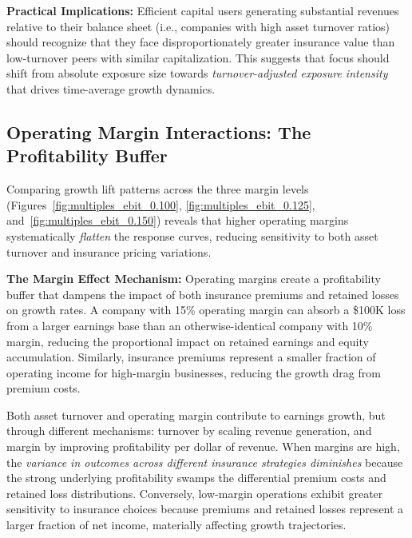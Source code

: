 \documentclass[11pt,letterpaper]{article}
\begin{document}
\vspace{\baselineskip}

\textbf{Practical Implications:} Efficient capital users generating substantial revenues relative to their balance sheet (i.e., companies with high asset turnover ratios) should recognize that they face disproportionately greater insurance value than low-turnover peers with similar capitalization. This suggests that focus should shift from absolute exposure size towards \emph{turnover-adjusted exposure intensity} that drives time-average growth dynamics.

\subsection{Operating Margin Interactions: The Profitability Buffer}

Comparing growth lift patterns across the three margin levels (Figures~\ref{fig:multiples_ebit_0.100}, \ref{fig:multiples_ebit_0.125}, and~\ref{fig:multiples_ebit_0.150}) reveals that higher operating margins systematically \emph{flatten} the response curves, reducing sensitivity to both asset turnover and insurance pricing variations.

\vspace{\baselineskip}

\textbf{The Margin Effect Mechanism:} Operating margins create a profitability buffer that dampens the impact of both insurance premiums and retained losses on growth rates. A company with 15\% operating margin can absorb a \$100K loss from a larger earnings base than an otherwise-identical company with 10\% margin, reducing the proportional impact on retained earnings and equity accumulation. Similarly, insurance premiums represent a smaller fraction of operating income for high-margin businesses, reducing the growth drag from premium costs.

Both asset turnover and operating margin contribute to earnings growth, but through different mechanisms: turnover by scaling revenue generation, and margin by improving profitability per dollar of revenue. When margins are high, the \emph{variance in outcomes across different insurance strategies diminishes} because the strong underlying profitability swamps the differential premium costs and retained loss distributions. Conversely, low-margin operations exhibit greater sensitivity to insurance choices because premiums and retained losses represent a larger fraction of net income, materially affecting growth trajectories.
\end{document}
